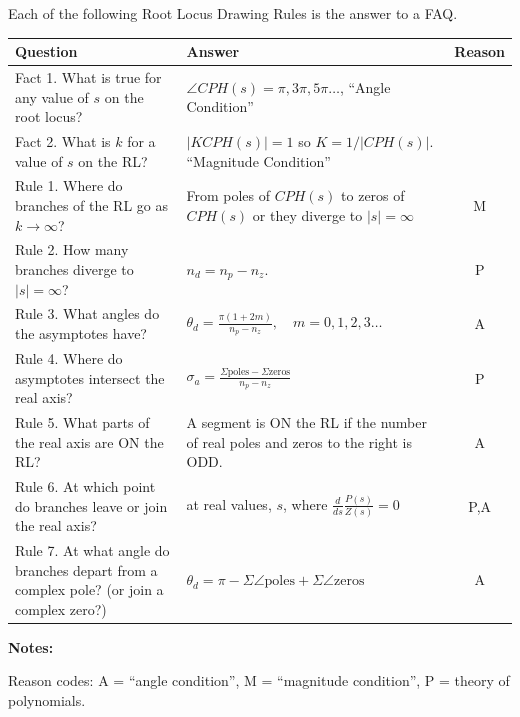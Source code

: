 

Each of the following Root Locus Drawing Rules is the answer to a FAQ.

\renewcommand\arraystretch{2.5}%
\begin{tabular}{p{2.5in}|p{2.5in}|c}
Question			&  Answer			& Reason	\\ \hline \hline
Fact 1. What is true for any value of $s$ on the root locus?
				&  $\angle{CPH(s)} = \pi, 3\pi, 5\pi \dots$, ``Angle Condition'' &     \\ \hline
Fact 2. What is $k$ for a value of $s$ on the RL?  &
$|KCPH(s)| = 1$ so $ K = 1/|CPH(s)|$. ``Magnitude Condition''                          &     \\ \hline\hline
Rule 1. Where do branches of the RL go as $k \to \infty$?  &
From poles of $CPH(s)$ to zeros of $CPH(s)$ or they diverge to $|s| = \infty$         & M     \\ \hline
Rule 2. How many branches diverge to  $|s| = \infty$?      &
$n_d = n_p-n_z$.                                                                & P      \\ \hline
Rule 3. What angles do the asymptotes have?                 &
$\theta_d = \frac{\pi(1+2m)}{n_p-n_z},\quad m= 0,1,2,3\dots$                    & A      \\ \hline
Rule 4. Where do asymptotes intersect the real axis?        &
$\sigma_a = \frac{\Sigma\mathrm{poles}- \Sigma\mathrm{zeros}}{n_p-n_z} $        & P      \\ \hline
Rule 5. What parts of the real axis are ON the RL?          &
A segment is ON the RL if the number of real poles and zeros to the right is ODD. & A     \\ \hline \hline
Rule 6. At which point do branches leave or join the real axis?    &
at real values, $s$, where $\frac{d}{ds}\frac{P(s)}{Z(s)}=0$                      & P,A    \\ \hline
Rule 7. At what angle do branches depart from a complex pole? (or join a complex zero?) &
$\theta_d = \pi-\Sigma\angle\mathrm{poles} + \Sigma\angle\mathrm{zeros} $           & A      \\ \hline
\end{tabular}


{\bf Notes:}

Reason codes:
A = ``angle condition'', M = ``magnitude condition'', P = theory of polynomials.

